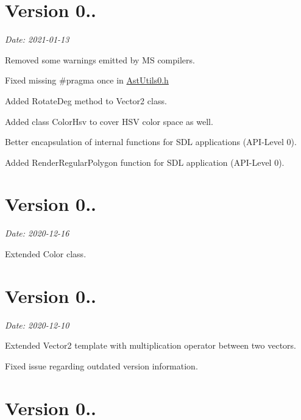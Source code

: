 \section*{Version 0..}

{\itshape Date\+: 2021-\/01-\/13}


\begin{DoxyItemize}
\item Removed some warnings emitted by MS compilers.
\item Fixed missing {\ttfamily \#pragma once} in \hyperlink{AstUtils0_8h}{Ast\+Utils0.\+h}
\item Added {\ttfamily Rotate\+Deg} method to {\ttfamily Vector2} class.
\item Added class \textquotesingle{} {\ttfamily Color\+Hsv} to cover H\+SV color space as well.
\item Better encapsulation of internal functions for S\+DL applications (A\+P\+I-\/\+Level 0).
\item Added {\ttfamily Render\+Regular\+Polygon} function for S\+DL application (A\+P\+I-\/\+Level 0).
\end{DoxyItemize}

\section*{Version 0..}

{\itshape Date\+: 2020-\/12-\/16}
\begin{DoxyItemize}
\item Extended {\ttfamily Color} class.
\end{DoxyItemize}

\section*{Version 0..}

{\itshape Date\+: 2020-\/12-\/10}


\begin{DoxyItemize}
\item Extended {\ttfamily Vector2} template with multiplication operator between two vectors.
\item Fixed issue regarding outdated version information.
\end{DoxyItemize}

\section*{Version 0..}


